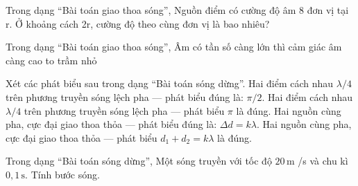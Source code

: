 \begin{ex}
Trong dạng “Bài toán giao thoa sóng”, Nguồn điểm có cường độ âm 8 đơn vị tại r. Ở khoảng cách 2r, cường độ theo cùng đơn vị là bao nhiêu?
\end{ex}

\begin{ex}
Trong dạng “Bài toán giao thoa sóng”, Âm có tần số càng lớn thì cảm giác âm càng
\choice
{\True cao}
{to}
{trầm}
{nhỏ}
\end{ex}

\begin{ex}
Xét các phát biểu sau trong dạng “Bài toán sóng dừng”.
\choiceTF
{\True Hai điểm cách nhau $\lambda/4$ trên phương truyền sóng lệch pha — phát biểu đúng là: $\pi/2$.}
{Hai điểm cách nhau $\lambda/4$ trên phương truyền sóng lệch pha — phát biểu $\pi$ là đúng.}
{\True Hai nguồn cùng pha, cực đại giao thoa thỏa — phát biểu đúng là: $\Delta d=k\lambda$.}
{Hai nguồn cùng pha, cực đại giao thoa thỏa — phát biểu $d_1+d_2=k\lambda$ là đúng.}
\end{ex}

\begin{bt}
Trong dạng “Bài toán sóng dừng”, Một sóng truyền với tốc độ $20\,\text{m}$ /s và chu kì $0,1\,\text{s}$. Tính bước sóng.
\end{bt}

